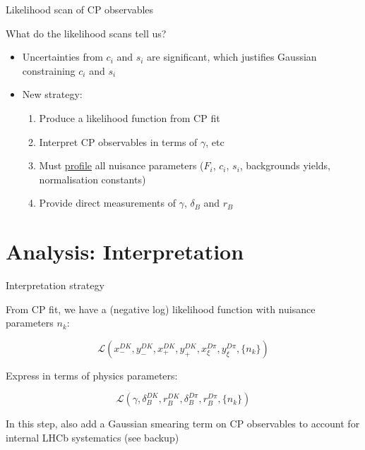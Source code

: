 \documentclass[xcolor={dvipsnames}]{beamer}
\begin{document}
\begin{frame}{Likelihood scan of CP observables}
  \begin{center}
    {\large What do the likelihood scans tell us?}
  \end{center}
  \begin{itemize}
    \setlength\itemsep{1.5em}
    \item{Uncertainties from $c_i$ and $s_i$ are significant, which justifies Gaussian constraining $c_i$ and $s_i$}
    \item{New strategy:}
    \begin{enumerate}
      \setlength\itemsep{0.5em}
      \item{Produce a likelihood function from CP fit}
      \item{Interpret CP observables in terms of $\gamma$, etc}
      \item{Must \underline{profile} all nuisance parameters ($F_i$, $c_i$, $s_i$, backgrounds yields, normalisation constants)}
      \item{Provide direct measurements of $\gamma$, $\delta_B$ and $r_B$}
    \end{enumerate}
  \end{itemize}
\end{frame}

\section{Analysis: Interpretation}
\begin{frame}{Interpretation strategy}
  \begin{center}
    {\large From CP fit, we have a (negative log) likelihood function with nuisance parameters $n_k$:}
  \end{center}
  \begin{equation*}
    \mathcal{L}(x_-^{DK}, y_-^{DK}, x_+^{DK}, y_+^{DK}, x_\xi^{D\pi}, y_\xi^{D\pi}, \{n_k\})
  \end{equation*}
  \vspace{0.1cm}
  \begin{center}
    {\large Express in terms of physics parameters:}
  \end{center}
  \begin{equation*}
    \mathcal{L}(\gamma, \delta_B^{DK}, r_B^{DK}, \delta_B^{D\pi}, r_B^{D\pi}, \{n_k\})
  \end{equation*}
  \vspace{0.1cm}
  \begin{center}
    {\normalsize In this step, also add a Gaussian smearing term on CP observables to account for internal LHCb systematics (see backup)}
  \end{center}
\end{frame}
\end{document}
